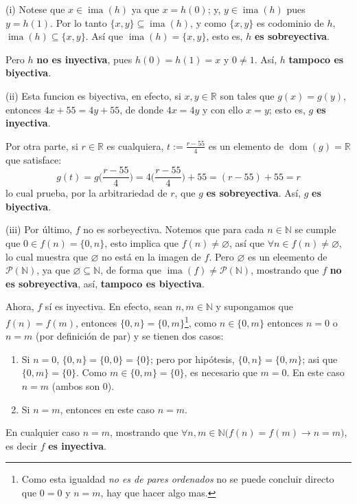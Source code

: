 \documentclass[letterpaper,DIV=14,headsepline,12pt]{scrartcl}
\makeatletter
\renewcommand{\emptyset}{\varnothing}
\DeclareMathOperator{\ima}{ima}
\DeclareMathOperator{\dom}{dom}
\newenvironment{solucion}[1][]{%
        \par\pushQED{\hfill \lozenge}%
        \normalfont\topsep6pt \partopsep0pt %
        \trivlist
        \item[\hskip\labelsep
                \textbf{\textit{Solución.}}%
        ]#1
        }{%
        \popQED\endtrivlist\@endpefalse
    }
\makeatother
\begin{document}
    \begin{solucion}
        (i) Notese que $x \in \ima(h)$ ya que $x=h(0)$; y, $y \in \ima(h)$ pues $y=h(1)$. Por lo tanto $\{x,y\} \subseteq \ima(h)$, y como $\{x,y\}$ es codominio de $h$, $\ima(h) \subseteq \{x,y\}$. Así que $\ima(h)=\{x,y\}$, esto es, $h$ \textbf{es sobreyectiva}.

        Pero $h$ \textbf{no es inyectiva}, pues $h(0)=h(1)=x$ y $0\neq 1$. Así, $h$ \textbf{tampoco es biyectiva}.

        (ii) Esta funcion es biyectiva, en efecto, si $x,y \in \mathbb{R}$ son tales que $g(x)=g(y)$, entonces $4x+55=4y+55$, de donde $4x=4y$ y con ello $x=y$; esto es, $g$ \textbf{es inyectiva}.

        Por otra parte, si $r \in \mathbb{R}$ es cualquiera, $t:=\frac{r-55}{4}$ es un elemento de $\dom(g)=\mathbb{R}$ que satisface:
        \[ g(t)=g\Big(\frac{r-55}{4}\Big) = 4 \Big(\frac{r-55}{4}\Big) +55 = (r-55)+55=r \]
        lo cual prueba, por la arbitrariedad de $r$, que $g$ \textbf{es sobreyectiva}. Así, $g$ \textbf{es biyectiva}.

        (iii) Por último, $f$ no es sorbeyectiva. Notemos que para cada $n \in \mathbb{N}$ se cumple que $0 \in f(n)=\{0,n\}$, esto implica que $f(n)\neq \emptyset$, así que $\forall n \in f(n) \neq \emptyset$, lo cual muestra que $\emptyset$ no está en la imagen de $f$. Pero $\emptyset$ es un eleemento de $\mathscr{P}(\mathbb{N})$, ya que $\emptyset \subseteq \mathbb{N}$, de forma que $\ima(f) \neq \mathscr{P}(\mathbb{N})$, mostrando que $f$ \textbf{no es sobreyectiva}, así, \textbf{tampoco es biyectiva}.

        Ahora, $f$ sí es inyectiva. En efecto, sean $n,m\in \mathbb{N}$ y supongamos que $f(n)=f(m)$, entonces $\{0,n\}=\{0,m\}$\footnote{Como esta igualdad \textit{no es de pares ordenados} no se puede concluir directo que $0=0$ y $n=m$, hay que hacer algo mas.}, como $n \in \{0,m\}$ entonces $n=0$ o $n=m$ (por definición de par) y se tienen dos casos:
        \begin{enumerate}
            \item Si $n=0$, $\{0,n\}=\{0,0\}=\{0\}$; pero por hipótesis, $\{0,n\}=\{0,m\}$; asi que $\{0,m\}=\{0\}$. Como $m \in \{0,m\}=\{0\}$, es necesario que $m=0$. En este caso $n=m$ (ambos son $0$).
            \item Si $n=m$, entonces en este caso $n=m$.
        \end{enumerate}
        En cualquier caso $n=m$, mostrando que $\forall n,m \in \mathbb{N} \big( f(n)=f(m) \rightarrow n=m \big)$, es decir $f$ \textbf{es inyectiva}.
    \end{solucion}
\end{document}
